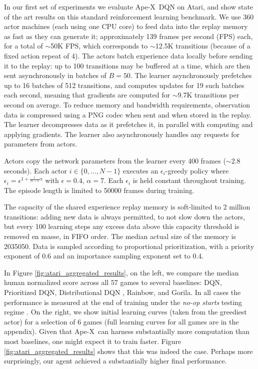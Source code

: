 \documentclass{article} %
\def\apex{Ape-X}
\begin{document}
\setlength\dashlinedash{1pt}
\setlength\dashlinegap{1.5pt}
\setlength\arrayrulewidth{0.3pt}

In our first set of experiments we evaluate \apex\ DQN on Atari, and show state of the art results on this standard reinforcement learning benchmark. We use 360 actor machines (each using one CPU core) to feed data into the replay memory as fast as they can generate it; approximately 139 frames per second (FPS) each, for a total of $\sim$50K FPS, which corresponds to $\sim$12.5K transitions (because of a fixed action repeat of 4). The actors batch experience data locally before sending it to the replay: up to 100 transitions may be buffered at a time, which are then sent asynchronously in batches of $B = 50$. The learner asynchronously prefetches up to 16 batches of 512 transitions, and computes updates for 19 such batches each second, meaning that gradients are computed for $\sim$9.7K transitions per second on average. To reduce memory and bandwidth requirements, observation data is compressed using a PNG codec when sent and when stored in the replay. The learner decompresses data as it prefetches it, in parallel with computing and applying gradients. The learner also asynchronously handles any requests for parameters from actors.

Actors copy the network parameters from the learner every 400 frames ($\sim$2.8 seconds). Each actor $i \in \{0, ..., N-1\}$ executes an $\epsilon_i$-greedy policy where $\epsilon_i = \epsilon^{1 + \frac{i}{N - 1} \alpha} $ with $\epsilon = 0.4$, $\alpha = 7$. Each $\epsilon_i$ is held constant throughout training. The episode length is limited to 50000 frames during training.

The capacity of the shared experience replay memory is soft-limited to 2 million transitions: adding new data is always permitted, to not slow down the actors, but every 100 learning steps any excess data above this capacity threshold is removed en masse, in FIFO order. The median actual size of the memory is 2035050. Data is sampled according to proportional prioritization, with a priority exponent of 0.6 and an importance sampling exponent set to 0.4.

In Figure \ref{fig:atari_aggregated_results}, on the left, we compare the median human normalized score across all 57 games to several baselines: DQN, Prioritized DQN, Distributional DQN \citep{distributional}, Rainbow, and Gorila. In all cases the performance is measured at the end of training under the \emph{no-op starts} testing regime \citep{dqn}. On the right, we show initial learning curves (taken from the greediest actor) for a selection of 6 games (full learning curves for all games are in the appendix). Given that \apex\ can harness substantially more computation than most baselines, one might expect it to train faster. Figure \ref{fig:atari_aggregated_results} shows that this was indeed the case. Perhaps more surprisingly, our agent achieved a substantially higher final performance.
\end{document}
